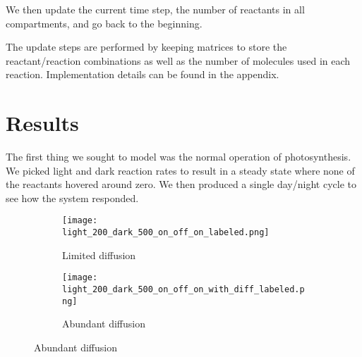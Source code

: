 \documentclass[12pt,reqno]{amsart}
\begin{document}
    We then update the current time step, the number of reactants in all compartments,
    and go back to the beginning.
    
    The update steps are performed by keeping matrices to store the reactant/reaction
    combinations as well as the number of molecules used in each reaction.  Implementation
    details can be found in the appendix.
	
	\section*{\large \textbf{Results}}
	
	The first thing we sought to model was the normal operation of photosynthesis.
	We picked light and dark reaction rates to result in a steady state where none of
	the reactants hovered around zero.  We then produced a single day/night cycle
	to see how the system responded.
	
	\begin{figure}[h]
        \caption{Normal photosynthesis, with and without diffusion}
        \label{normal}
        \centering
        \begin{subfigure}[b]{0.45\textwidth}
            \texttt{[image: light\_200\_dark\_500\_on\_off\_on\_labeled.png]}    
            \caption{Limited diffusion}
            \label{normal_no_diff}
        \end{subfigure}
        \begin{subfigure}[b]{0.45\textwidth}
            \texttt{[image: light\_200\_dark\_500\_on\_off\_on\_with\_diff\_labeled.png]}
            \caption{Abundant diffusion}
            \label{normal_diff}
        \end{subfigure}
    \end{figure}
    
\end{document}
